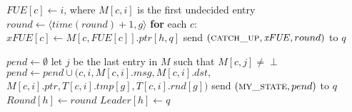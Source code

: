 \begin{algorithm}
\footnotesize

\begin{distribalgo}[1]

		\STATE $\mathit{FUE}[c] \leftarrow i$, where $M[c,i]$ is the first undecided entry %
	\ENDFOR
	\STATE $round \leftarrow \langle time(round)+1,g \rangle$
			\STATE \textbf{for} each $c$: $\mathit{xFUE}[c] \leftarrow M[c,\mathit{FUE}[c]].ptr[h,q]$
			\STATE \textsf{send} $(\textsc{catch\_up}, \mathit{xFUE}, round)$ to $q$
		\ENDINDENT
	\ENDINDENT
\ENDWHEN

\vspace{2.0mm}
		\STATE $pend \leftarrow \emptyset$
			\STATE let $j$ be the last entry in $M$ such that $M[c,j] \neq \perp$
					\STATE $pend \leftarrow pend \cup (c,i,M[c,i].msg,M[c,i].dst,$ \\ 
						\hfill $M[c,i].ptr,T[c,i].tmp[g],T[c,i].rnd[g])$
				\ENDIF
			\ENDFOR
		\ENDFOR
		\STATE \textsf{send} $(\textsc{my\_state},pend)$ to $q$
		\STATE $Round[h] \leftarrow round$
		\STATE $Leader[h] \leftarrow q$
\ENDWHEN


\end{distribalgo}
\end{algorithm}
